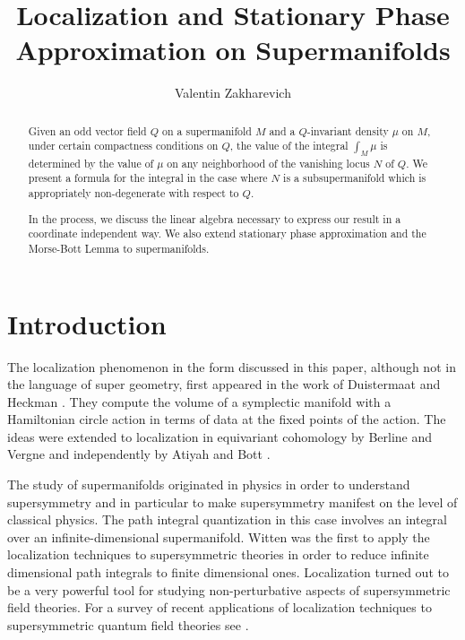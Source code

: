 \documentclass[11pt]{amsart}
\numberwithin{equation}{section}
\numberwithin{figure}{section}
\theoremstyle{plain}
\theoremstyle{definition}
\theoremstyle{remark}
\begin{document}
\title{Localization and Stationary Phase Approximation on Supermanifolds}
\begin{abstract}
Given an odd vector field $Q$ on a supermanifold $M$ and a $Q$-invariant
density $\mu$ on $M$, under certain compactness conditions on $Q$,
the value of the integral $\int_{M}\mu$ is determined by the value
of $\mu$ on any neighborhood of the vanishing locus $N$ of $Q$.
We present a formula for the integral in the case where $N$ is a
subsupermanifold which is appropriately non-degenerate with respect
to $Q$. 

In the process, we discuss the linear algebra necessary to express
our result in a coordinate independent way. We also extend stationary
phase approximation and the Morse-Bott Lemma to supermanifolds.
\end{abstract}

\author{Valentin Zakharevich}

\maketitle
\tableofcontents{}


\section{Introduction}

The localization phenomenon in the form discussed in this paper, although
not in the language of super geometry, first appeared in the work
of Duistermaat and Heckman \cite{Duistermaat_Heckman}. They compute
the volume of a symplectic manifold with a Hamiltonian circle action
in terms of data at the fixed points of the action. The ideas were
extended to localization in equivariant cohomology by Berline and
Vergne \cite{Berline_Vergne} and independently by Atiyah and Bott
\cite{Atiyah_Bott_moment_map}. 

The study of supermanifolds originated in physics in order to understand
supersymmetry and in particular to make supersymmetry manifest on
the level of classical physics. The path integral quantization in
this case involves an integral over an infinite-dimensional supermanifold.
Witten \cite{Witten_Supersymmetry_and_Morse_Theory} was the first
to apply the localization techniques to supersymmetric theories in
order to reduce infinite dimensional path integrals to finite dimensional
ones. Localization turned out to be a very powerful tool for studying
non-perturbative aspects of supersymmetric field theories. For a survey
of recent applications of localization techniques to supersymmetric
quantum field theories see \cite{Pestun_Localization_techniques}.
\end{document}
